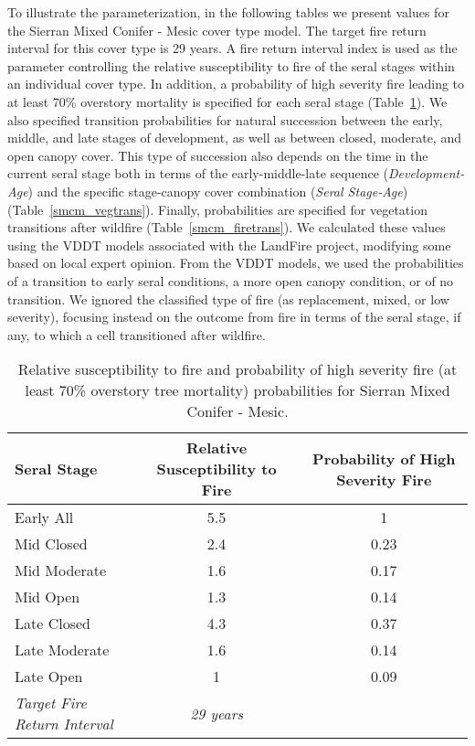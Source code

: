 To illustrate the parameterization, in the following tables we present values for the Sierran Mixed Conifer - Mesic cover type model. The target fire return interval for this cover type is 29 years. A fire return interval index is used as the parameter controlling the relative susceptibility to fire of the seral stages within an individual cover type. In addition, a probability of high severity fire leading to at least 70\% overstory mortality is specified for each seral stage (Table~\ref{smcm_fri_phm}). We also specified transition probabilities for natural succession between the early, middle, and late stages of development, as well as between closed, moderate, and open canopy cover. This type of succession also depends on the time in the current seral stage both in terms of the early-middle-late sequence (\emph{Development-Age}) and the specific stage-canopy cover combination (\emph{Seral Stage-Age}) (Table~\ref{smcm_vegtrans}). Finally, probabilities are specified for vegetation transitions after wildfire (Table~\ref{smcm_firetrans}). We calculated these values using the VDDT models associated with the LandFire project, modifying some based on local expert opinion. From the VDDT models, we used the probabilities of a transition to early seral conditions, a more open canopy condition, or of no transition. We ignored the classified type of fire (as replacement, mixed, or low severity), focusing instead on the outcome from fire in terms of the seral stage, if any, to which a cell transitioned after wildfire.

\begin{table}[htbp]
\small
\centering
\caption{Relative susceptibility to fire and probability of high severity fire (at least 70\% overstory tree mortality) probabilities for Sierran Mixed Conifer - Mesic.}
\label{smcm_fri_phm}
\begin{tabular}{lcc}
\hline
\textbf{Seral Stage}    & \textbf{Relative Susceptibility to Fire} & \textbf{Probability of High Severity Fire} \\ \hline
Early All     				& 5.5        & 1                 \\
Mid Closed    				& 2.4        & 0.23              \\
Mid Moderate  				& 1.6        & 0.17              \\
Mid Open      				& 1.3        & 0.14              \\
Late Closed   				& 4.3        & 0.37              \\
Late Moderate 				& 1.6        & 0.14              \\
Late Open     				& 1          & 0.09              \\ 
\emph{Target Fire Return Interval}    			& \emph{29 years}  &   \\ \hline
\end{tabular}

\end{table}

